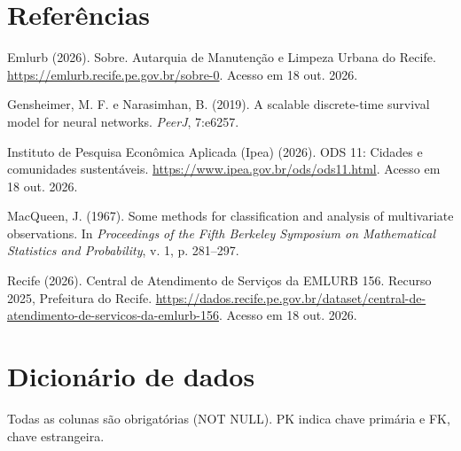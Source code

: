\documentclass[12pt,a4paper]{article}
\begin{document}
\section*{Referências}
\begin{list}{}{\leftmargin=0.6cm\itemindent=-0.6cm\itemsep=3pt\parsep=0pt}
\small
\item Emlurb (2026). Sobre. Autarquia de Manutenção e Limpeza Urbana do Recife. \url{https://emlurb.recife.pe.gov.br/sobre-0}. Acesso em 18 out. 2026.
\item Gensheimer, M. F. e Narasimhan, B. (2019). A scalable discrete-time survival model for neural networks. \textit{PeerJ}, 7:e6257.
\item Instituto de Pesquisa Econômica Aplicada (Ipea) (2026). ODS 11: Cidades e comunidades sustentáveis. \url{https://www.ipea.gov.br/ods/ods11.html}. Acesso em 18 out. 2026.
\item MacQueen, J. (1967). Some methods for classification and analysis of multivariate observations. In \textit{Proceedings of the Fifth Berkeley Symposium on Mathematical Statistics and Probability}, v. 1, p. 281--297.
\item Recife (2026). Central de Atendimento de Serviços da EMLURB 156. Recurso 2025, Prefeitura do Recife. \url{https://dados.recife.pe.gov.br/dataset/central-de-atendimento-de-servicos-da-emlurb-156}. Acesso em 18 out. 2026.
\end{list}

\clearpage
\appendix
\renewcommand{\thesection}{\Alph{section}}
\titleformat{\section}{\fontsize{13}{15}\selectfont\bfseries}{Apêndice \thesection.}{0.4em}{}

\section{Dicionário de dados}

Todas as colunas são obrigatórias (NOT NULL). PK indica chave primária e FK, chave estrangeira.
\end{document}
